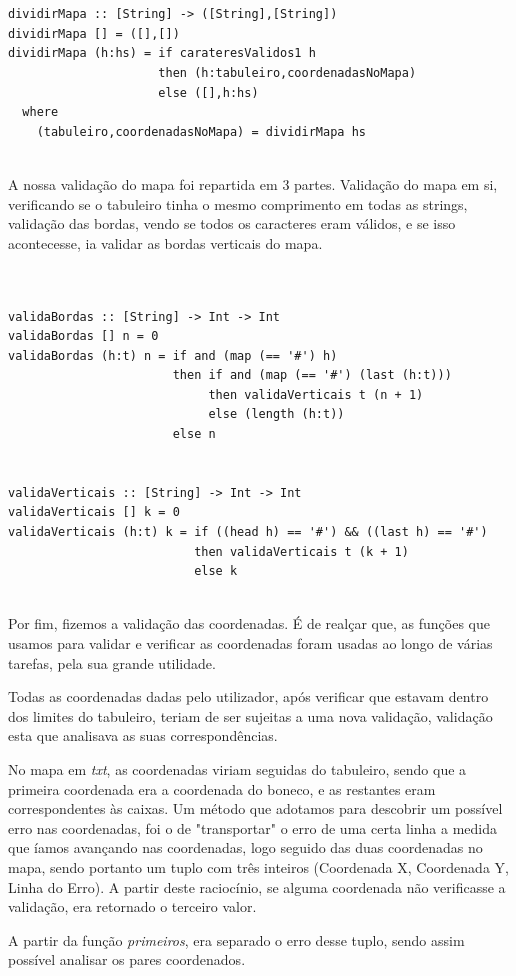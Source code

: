 \documentclass[a4paper]{article}
\begin{document}
\begin{Verbatim}


dividirMapa :: [String] -> ([String],[String])
dividirMapa [] = ([],[])
dividirMapa (h:hs) = if carateresValidos1 h 
                     then (h:tabuleiro,coordenadasNoMapa) 
                     else ([],h:hs)
  where
    (tabuleiro,coordenadasNoMapa) = dividirMapa hs


\end{Verbatim} 


A nossa validação do mapa foi repartida em 3 partes. Validação do mapa em si, verificando se o tabuleiro tinha o mesmo comprimento em todas as strings, validação das bordas, vendo se todos os caracteres eram válidos, e se isso acontecesse, ia validar as bordas verticais do mapa. \par

\begin{Verbatim}


validaBordas :: [String] -> Int -> Int
validaBordas [] n = 0
validaBordas (h:t) n = if and (map (== '#') h)
                       then if and (map (== '#') (last (h:t)))
                            then validaVerticais t (n + 1)
                            else (length (h:t))  
                       else n 

     
validaVerticais :: [String] -> Int -> Int
validaVerticais [] k = 0
validaVerticais (h:t) k = if ((head h) == '#') && ((last h) == '#')
                          then validaVerticais t (k + 1)
                          else k 


\end{Verbatim}


Por fim, fizemos a validação das coordenadas. É de realçar que, as funções que usamos para validar e verificar as coordenadas foram usadas ao longo de várias tarefas, pela sua grande utilidade. \par
Todas as coordenadas dadas pelo utilizador, após verificar que estavam dentro dos limites do tabuleiro, teriam de ser sujeitas a uma nova validação, validação esta que analisava as suas correspondências. \par
No mapa em \textit{txt}, as coordenadas viriam seguidas do tabuleiro, sendo que a primeira coordenada era a coordenada do boneco, e as restantes eram correspondentes às caixas. Um método que adotamos para descobrir um possível erro nas coordenadas, foi o de "transportar" o erro de uma certa linha a medida que íamos avançando nas coordenadas, logo seguido das duas coordenadas no mapa, sendo portanto um tuplo com três inteiros (Coordenada X, Coordenada Y, Linha do Erro). A partir deste raciocínio, se alguma coordenada não verificasse a validação, era retornado o terceiro valor. \par 
A partir da função \textit{primeiros}, era separado o erro desse tuplo, sendo assim possível analisar os pares coordenados. \par
\end{document}

